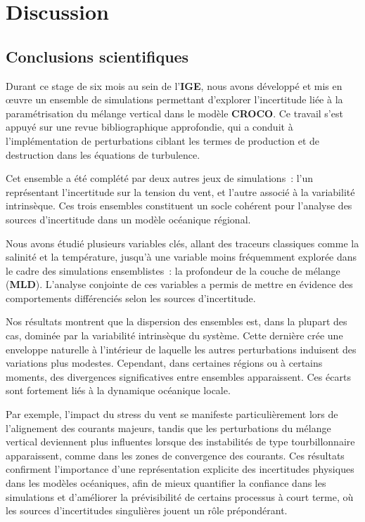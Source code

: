 \chapter{Discussion}

\section{Conclusions scientifiques}

Durant ce stage de six mois au sein de l'\textbf{IGE}, nous avons développé et mis en œuvre un ensemble de simulations permettant d’explorer l’incertitude liée à la paramétrisation du mélange vertical dans le modèle \textbf{CROCO}. Ce travail s’est appuyé sur une revue bibliographique approfondie, qui a conduit à l’implémentation de perturbations ciblant les termes de production et de destruction dans les équations de turbulence.

Cet ensemble a été complété par deux autres jeux de simulations~: l’un représentant l’incertitude sur la tension du vent, et l’autre associé à la variabilité intrinsèque. Ces trois ensembles constituent un socle cohérent pour l’analyse des sources d’incertitude dans un modèle océanique régional.

Nous avons étudié plusieurs variables clés, allant des traceurs classiques comme la salinité et la température, jusqu’à une variable moins fréquemment explorée dans le cadre des simulations ensemblistes~: la profondeur de la couche de mélange (\textbf{MLD}). L’analyse conjointe de ces variables a permis de mettre en évidence des comportements différenciés selon les sources d’incertitude.

Nos résultats montrent que la dispersion des ensembles est, dans la plupart des cas, dominée par la variabilité intrinsèque du système. Cette dernière crée une enveloppe naturelle à l’intérieur de laquelle les autres perturbations induisent des variations plus modestes. Cependant, dans certaines régions ou à certains moments, des divergences significatives entre ensembles apparaissent. Ces écarts sont fortement liés à la dynamique océanique locale.

Par exemple, l’impact du stress du vent se manifeste particulièrement lors de l’alignement des courants majeurs, tandis que les perturbations du mélange vertical deviennent plus influentes lorsque des instabilités de type tourbillonnaire apparaissent, comme dans les zones de convergence des courants. Ces résultats confirment l'importance d'une représentation explicite des incertitudes physiques dans les modèles océaniques, afin de mieux quantifier la confiance dans les simulations et d’améliorer la prévisibilité de certains processus à court terme, où les sources d'incertitudes singulières jouent un rôle prépondérant.

